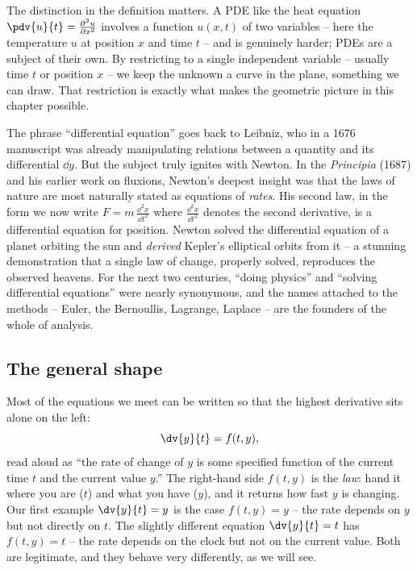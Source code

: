 The distinction in the definition matters. A PDE like the heat equation $\pdv{u}{t} = \frac{\partial^2 u}{\partial x^2}$ involves a function $u(x,t)$ of two variables -- here the temperature $u$ at position $x$ and time $t$ -- and is genuinely harder; PDEs are a subject of their own. By restricting to a single independent variable -- usually time $t$ or position $x$ -- we keep the unknown a curve in the plane, something we can draw. That restriction is exactly what makes the geometric picture in this chapter possible.

\begin{historybox}
The phrase ``differential equation'' goes back to Leibniz, who in a 1676 manuscript was already manipulating relations between a quantity and its differential $\dd y$. But the subject truly ignites with Newton. In the \emph{Principia} (1687) and his earlier work on fluxions, Newton's deepest insight was that the laws of nature are most naturally stated as equations of \emph{rates}. His second law, in the form we now write $F = m\,\frac{\dd^2 x}{\dd t^2}$ where $\frac{\dd^2 x}{\dd t^2}$ denotes the second derivative, is a differential equation for position. Newton solved the differential equation of a planet orbiting the sun and \emph{derived} Kepler's elliptical orbits from it -- a stunning demonstration that a single law of change, properly solved, reproduces the observed heavens. For the next two centuries, ``doing physics'' and ``solving differential equations'' were nearly synonymous, and the names attached to the methods -- Euler, the Bernoullis, Lagrange, Laplace -- are the founders of the whole of analysis.
\end{historybox}

\subsection{The general shape}

Most of the equations we meet can be written so that the highest derivative sits alone on the left:
\[
  \dv{y}{t} = f(t, y),
\]
read aloud as ``the rate of change of $y$ is some specified function of the current time $t$ and the current value $y$.'' The right-hand side $f(t,y)$ is the \emph{law}: hand it where you are ($t$) and what you have ($y$), and it returns how fast $y$ is changing. Our first example $\dv{y}{t} = y$ is the case $f(t,y) = y$ -- the rate depends on $y$ but not directly on $t$. The slightly different equation $\dv{y}{t} = t$ has $f(t,y) = t$ -- the rate depends on the clock but not on the current value. Both are legitimate, and they behave very differently, as we will see.

